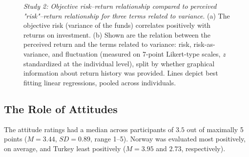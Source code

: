 \documentclass[a4paper,man, natbib,floatsintext]{apa6} %
\begin{document}
{%
\begin{figure}[h!] 
 \centering
  \caption{\textit{Study 2: Objective risk--return relationship compared to perceived "risk"--return relationship for three terms related to variance}. (a) The objective risk (variance of the funds) correlates positively with returns on investment. (b) Shown are the relation between the perceived return and the terms related to variance: risk, risk-as-variance, and fluctuation (measured on 7-point Likert-type scales, \textit{z} standardized at the individual level), split by whether graphical information about return history was provided. Lines depict best fitting linear regressions, pooled across individuals.}
  \label{fig:study2_rrc}
\end{figure}
%

\clearpage

\subsection{The Role of Attitudes}
The attitude ratings had a median across participants of $3.5$ out of maximally 5 points ($M=3.44$, $SD=0.89$, range 1--5). Norway was evaluated most positively, on average, and Turkey least positively ($M=3.95$ and $2.73$, respectively).

}
\end{document}

